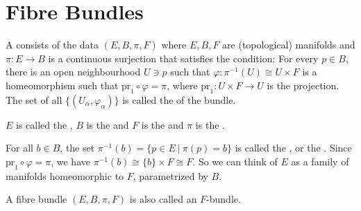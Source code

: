 \documentclass[main.tex]{subfiles}
\begin{document}
\section{Fibre Bundles}

\begin{defn}
A  consists of the data $(E, B, \pi, F)$ where $E, B, F$ are (topological) manifolds and $\pi : E \to B$ is a continuous surjection that satisfies the  condition: For every $p \in B$, there is an open neighbourhood $U \ni p$ such that $\varphi: \pi^{-1}(U)  \cong U \times F$ is a homeomorphism such that $\text{pr}_1 \circ \varphi = \pi$, where $\text{pr}_1 : U \times F \to U$ is the projection. The set of all $\{(U_\alpha, \varphi_\alpha) \}$ is called the  of the bundle.

$E$ is called the , $B$ is the  and $F$ is the  and $\pi$ is the .
\end{defn}

\begin{note}
For all $b \in B$, the set $\pi^{-1}(b) = \{ p \in E \ | \ \pi(p) = b \}$ is called the , or the . Since $\text{pr}_1 \circ \varphi = \pi$, we have $\pi^{-1}(b) \cong \{ b\} \times F \cong F$. So we can think of $E$ as a family of manifolds homeomorphic to $F$, parametrized by $B$.
\end{note}

\begin{note}
A fibre bundle $(E, B, \pi, F)$ is also called an $F$-bundle.
\end{note}
\end{document}
